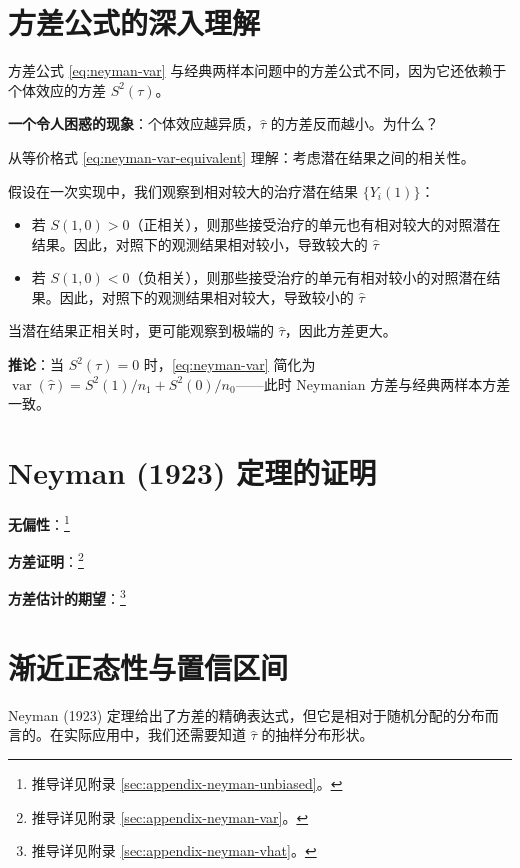 \section{方差公式的深入理解}\label{sec:4-5}

方差公式 \cref{eq:neyman-var} 与经典两样本问题中的方差公式不同，因为它还依赖于个体效应的方差 $S^2(\tau)$。

\textbf{一个令人困惑的现象}：个体效应越异质，$\hat{\tau}$ 的方差反而越小。为什么？

从等价格式 \cref{eq:neyman-var-equivalent} 理解：考虑潜在结果之间的相关性。

假设在一次实现中，我们观察到相对较大的治疗潜在结果 $\{Y_i(1)\}$：
\begin{itemize}
  \item 若 $S(1,0) > 0$（正相关），则那些接受治疗的单元也有相对较大的对照潜在结果。因此，对照下的观测结果相对较小，导致较大的 $\hat{\tau}$
  \item 若 $S(1,0) < 0$（负相关），则那些接受治疗的单元有相对较小的对照潜在结果。因此，对照下的观测结果相对较大，导致较小的 $\hat{\tau}$
\end{itemize}

当潜在结果正相关时，更可能观察到极端的 $\hat{\tau}$，因此方差更大。

\textbf{推论}：当 $S^2(\tau) = 0$ 时，\cref{eq:neyman-var} 简化为 $\operatorname{var}(\hat{\tau}) = S^2(1)/n_1 + S^2(0)/n_0$——此时 Neymanian 方差与经典两样本方差一致。

\section{Neyman (1923) 定理的证明}\label{sec:prove-neyman1923}

\textbf{无偏性}：\footnote{推导详见附录 \cref{sec:appendix-neyman-unbiased}。}

\textbf{方差证明}：\footnote{推导详见附录 \cref{sec:appendix-neyman-var}。}

\textbf{方差估计的期望}：\footnote{推导详见附录 \cref{sec:appendix-neyman-vhat}。}

\section{渐近正态性与置信区间}\label{sec:4-6}

Neyman (1923) 定理给出了方差的精确表达式，但它是相对于随机分配的分布而言的。在实际应用中，我们还需要知道 $\hat{\tau}$ 的抽样分布形状。

